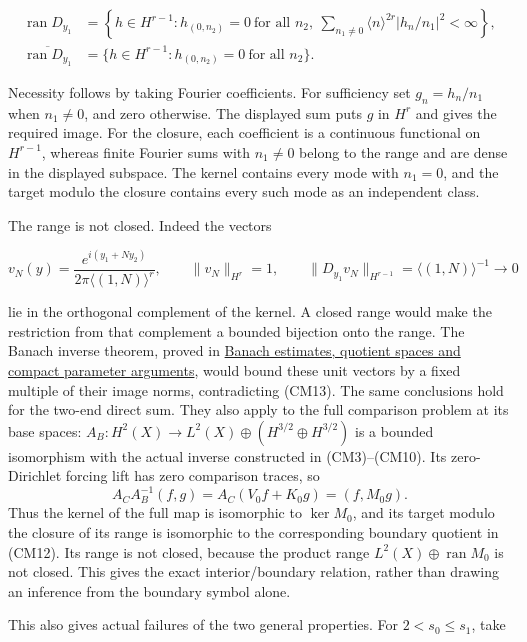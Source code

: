 \documentclass[
  11pt,
]{article}
\begin{document}
\[
 \begin{aligned}
 \operatorname{ran}D_{y_1}
 &=\left\{h\in H^{r-1}:h_{(0,n_2)}=0\ \text{for all }n_2,
     \ \sum_{n_1\ne0}\langle n\rangle^{2r}
                         |h_n/n_1|^2<\infty\right\},\\
 \overline{\operatorname{ran}D_{y_1}}
 &=\{h\in H^{r-1}:h_{(0,n_2)}=0\ \text{for all }n_2\}.
 \end{aligned}
 \tag{CM12}
\]

Necessity follows by taking Fourier coefficients. For sufficiency set
\(g_n=h_n/n_1\) when \(n_1\ne0\), and zero otherwise. The displayed sum
puts \(g\) in \(H^r\) and gives the required image. For the closure,
each coefficient is a continuous functional on \(H^{r-1}\), whereas
finite Fourier sums with \(n_1\ne0\) belong to the range and are dense
in the displayed subspace. The kernel contains every mode with
\(n_1=0\), and the target modulo the closure contains every such mode as
an independent class.

The range is not closed. Indeed the vectors

\[
 v_N(y)=\frac{e^{i(y_1+Ny_2)}}{2\pi\langle(1,N)\rangle^r},\qquad
 \|v_N\|_{H^r}=1,\qquad
 \|D_{y_1}v_N\|_{H^{r-1}}=\langle(1,N)\rangle^{-1}\longrightarrow0
 \tag{CM13}
\]

lie in the orthogonal complement of the kernel. A closed range would
make the restriction from that complement a bounded bijection onto the
range. The Banach inverse theorem, proved in
\href{banach-foundation-bridges.pdf}{Banach estimates, quotient spaces
and compact parameter arguments}, would bound these unit vectors by a
fixed multiple of their image norms, contradicting (CM13). The same
conclusions hold for the two-end direct sum. They also apply to the full
comparison problem at its base spaces:
\(A_B:H^2(X)\to L^2(X)\oplus(H^{3/2}\oplus H^{3/2})\) is a bounded
isomorphism with the actual inverse constructed in (CM3)--(CM10). Its
zero-Dirichlet forcing lift has zero comparison traces, so \[
 A_C A_B^{-1}(f,g)
       =A_C(V_0f+K_0g)=(f,M_0g).
 \tag{CM15}
\] Thus the kernel of the full map is isomorphic to \(\ker M_0\), and
its target modulo the closure of its range is isomorphic to the
corresponding boundary quotient in (CM12). Its range is not closed,
because the product range \(L^2(X)\oplus\operatorname{ran}M_0\) is not
closed. This gives the exact interior/boundary relation, rather than
drawing an inference from the boundary symbol alone.

This also gives actual failures of the two general properties. For
\(2<s_0\leq s_1\), take
\end{document}
